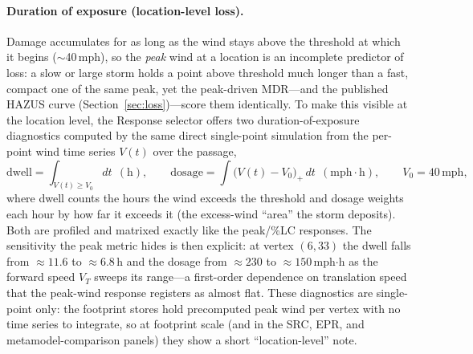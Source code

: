 \documentclass[11pt]{article}
\begin{document}
\paragraph{Duration of exposure (location-level loss).}
Damage accumulates for as long as the wind stays above the threshold at which it
begins ($\sim$40\,mph), so the \emph{peak} wind at a location is an incomplete
predictor of loss: a slow or large storm holds a point above threshold much longer
than a fast, compact one of the same peak, yet the peak-driven MDR---and the
published HAZUS curve (Section~\ref{sec:loss})---score them identically. To make
this visible at the location level, the Response selector offers two
duration-of-exposure diagnostics computed by the same direct single-point
simulation from the per-point wind time series $V(t)$ over the passage,
\[
\text{dwell}=\!\!\int_{V(t)\ge V_0}\!\!\!\! dt \ \ (\text{h}),
\qquad
\text{dosage}=\!\!\int \big(V(t)-V_0\big)_{+}\, dt \ \ (\text{mph}{\cdot}\text{h}),
\qquad V_0=40\,\text{mph},
\]
where dwell counts the hours the wind exceeds the threshold and dosage weights each
hour by how far it exceeds it (the excess-wind ``area'' the storm deposits). Both
are profiled and matrixed exactly like the peak/\%LC responses. The sensitivity the
peak metric hides is then explicit: at vertex $(6,33)$ the dwell falls from
$\approx11.6$ to $\approx6.8$\,h and the dosage from $\approx230$ to
$\approx150$\,mph$\cdot$h as the forward speed $V_T$ sweeps its range---a
first-order dependence on translation speed that the peak-wind response registers
as almost flat. These diagnostics are single-point only: the footprint stores hold
precomputed peak wind per vertex with no time series to integrate, so at footprint
scale (and in the SRC, EPR, and metamodel-comparison panels) they show a short
``location-level'' note.
\end{document}

